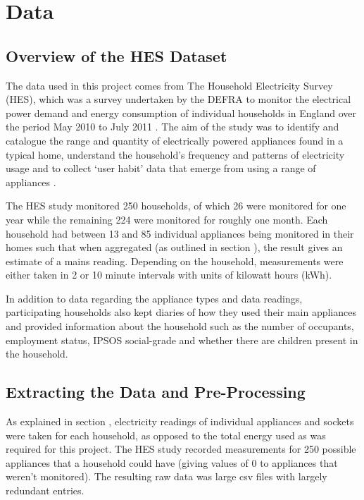 \chapter{Data}


\section{Overview of the HES Dataset}
The data used in this project comes from The Household Electricity Survey (HES), which was a survey undertaken by the DEFRA to monitor the electrical power demand and energy consumption of individual households in England over the period May 2010 to July 2011 \cite{HES}. The aim of the study was to identify and catalogue the range and quantity of electrically powered appliances found in a typical home, understand the household's frequency and patterns of electricity usage and to collect `user habit' data that emerge from using a range of appliances \cite{early findings}.

The HES study monitored 250 households, of which 26 were monitored for one year while the remaining 224 were monitored for roughly one month. Each household had between 13 and 85 individual appliances being monitored in their homes such that when aggregated (as outlined in section \aggregationSection), the result gives an estimate of a mains reading. Depending on the household, measurements were either taken in 2 or 10 minute intervals with units of kilowatt hours (kWh).

In addition to data regarding the appliance types and data readings, participating households also kept diaries of how they used their main appliances and provided information about the household such as the number of occupants, employment status, IPSOS social-grade and whether there are children present in the household.


\section{Extracting the Data and Pre-Processing}

As explained in section \mentionOfAggregationSection, electricity readings of individual appliances and sockets were taken for each household, as opposed to the total energy used as was required for this project. The HES study recorded measurements for 250 possible appliances that a household could have (giving values of 0 to appliances that weren't monitored). The resulting raw data was large csv files with largely redundant entries. 

